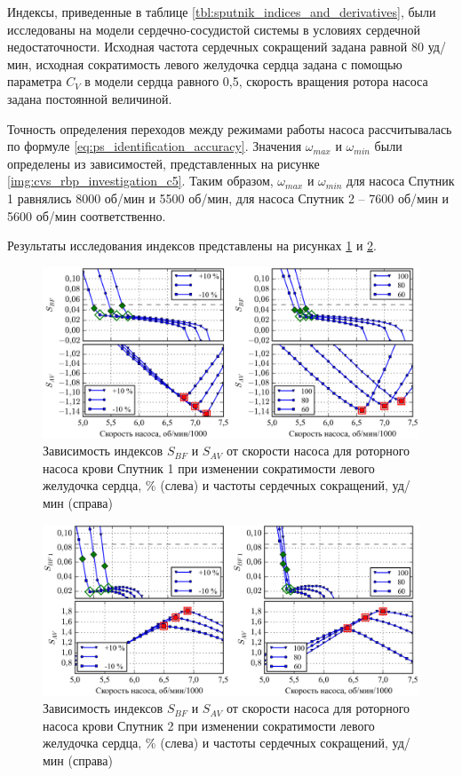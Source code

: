 Индексы, приведенные в таблице \ref{tbl:sputnik_indices_and_derivatives}, были исследованы на модели сердечно-сосудистой системы в условиях сердечной недостаточности. Исходная частота сердечных сокращений задана равной 80 уд/мин, исходная сократимость левого желудочка сердца задана с помощью параметра $C_V$ в модели сердца равного 0,5, скорость вращения ротора насоса задана постоянной величиной. 

Точность определения переходов между режимами работы насоса рассчитывалась по формуле \eqref{eq:ps_identification_accuracy}. Значения $\omega_{max}$ и $\omega_{min}$ были определены из зависимостей, представленных на рисунке \ref{img:cvs_rbp_investigation_c5}. Таким образом, $\omega_{max}$ и $\omega_{min}$ для насоса Спутник 1 равнялись 8000 об/мин и 5500 об/мин, для насоса Спутник 2 -- 7600 об/мин и 5600 об/мин соответственно. 

Результаты исследования индексов представлены на рисунках \ref{img:cvs_model_test_s1} и \ref{img:cvs_model_test_s2}.

\begin{figure}[!ht] 
  \center
  \includegraphics [scale=1.0] {../images/c4_cvs_pumping_states_sputnik_1}
  \caption{Зависимость индексов $S_{BF}$ и $S_{AV}$ от скорости насоса для роторного насоса крови Спутник 1 при изменении сократимости левого желудочка сердца, \% (слева) и частоты сердечных сокращений, уд/мин (справа)} 
  \label{img:cvs_model_test_s1}  
\end{figure}

\begin{figure}[!ht] 
  \center
  \includegraphics [scale=1.0] {../images/c4_cvs_pumping_states_sputnik_2}
  \caption{Зависимость индексов $S_{BF}$ и $S_{AV}$ от скорости насоса для роторного насоса крови Спутник 2 при изменении сократимости левого желудочка сердца, \% (слева) и частоты сердечных сокращений, уд/мин (справа)} 
  \label{img:cvs_model_test_s2}  
\end{figure}

